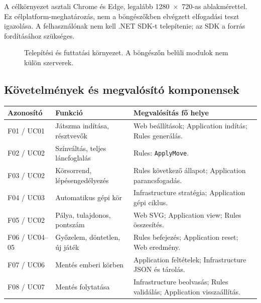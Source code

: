 \documentclass[11pt,a4paper]{article}
\newcommand{\code}[1]{\nolinkurl{#1}}
\begin{document}
A célkörnyezet asztali Chrome és Edge, legalább 1280~$\times$~720-as ablakmérettel. Ez célplatform-meghatározás, nem a böngészőkben elvégzett elfogadási teszt igazolása. A felhasználónak nem kell .NET SDK-t telepítenie; az SDK a forrás fordításához szükséges.

\begin{figure}[htbp]\centering
{}
\caption{Telepítési és futtatási környezet. A böngészőn belüli modulok nem külön szerverek.}
\end{figure}

\subsection{Követelmények és megvalósító komponensek}
\begin{tabularx}{\linewidth}{@{}lYY@{}}\toprule
Azonosító & Funkció & Megvalósítás fő helye \\\midrule
F01 / UC01 & Játszma indítása, résztvevők & Web beállítások; Application indítás; Rules generálás.\\
F02 / UC02 & Színváltás, teljes láncfoglalás & Rules: \code{ApplyMove}.\\
F03 / UC02 & Körsorrend, lépésengedélyezés & Rules következő állapot; Application parancsfogadás.\\
F04 / UC03 & Automatikus gépi kör & Infrastructure stratégia; Application gépi ciklus.\\
F05 / UC02 & Pálya, tulajdonos, pontszám & Web SVG; Application view; Rules összesítés.\\
F06 / UC04--05 & Győzelem, döntetlen, új játék & Rules befejezés; Application reset; Web eredmény.\\
F07 / UC06 & Mentés emberi körben & Application feltételek; Infrastructure JSON és tárolás.\\
F08 / UC07 & Mentés folytatása & Infrastructure beolvasás; Rules validálás; Application visszaállítás.\\\bottomrule
\end{tabularx}
\end{document}
